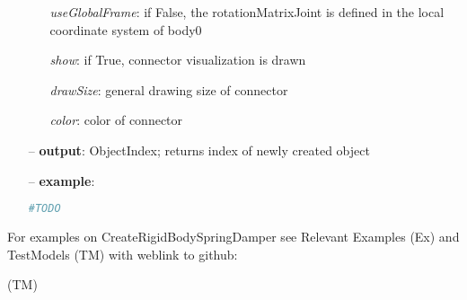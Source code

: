 \begin{itemize}[leftmargin=0.7cm]
\begin{itemize}[leftmargin=1.2cm]
\item[]{\it useGlobalFrame}: if False, the rotationMatrixJoint is defined in the local coordinate system of body0
\item[]{\it show}: if True, connector visualization is drawn
\item[]{\it drawSize}: general drawing size of connector
\item[]{\it color}: color of connector
\end{itemize}
\item[--]
{\bf output}: ObjectIndex; returns index of newly created object
\item[--]
{\bf example}: \vspace{-12pt}\ei\begin{lstlisting}[language=Python, xleftmargin=36pt]
  #TODO
\end{lstlisting}\vspace{-24pt}\bi\item[]\vspace{-24pt}\vspace{12pt}\end{itemize}
%

%
\noindent For examples on CreateRigidBodySpringDamper see Relevant Examples (Ex) and TestModels (TM) with weblink to github:
\bi
 \item \footnotesize {} (TM)
\ei

